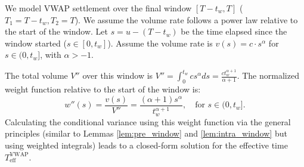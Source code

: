 \documentclass[11pt]{article}
\theoremstyle{plain}
\begin{document}
We model VWAP settlement over the final window $[T-t_w, T]$ ($T_1=T-t_w, T_2=T$). We assume the volume rate follows a power law relative to the start of the window. Let $s = u - (T-t_w)$ be the time elapsed since the window started ($s \in [0, t_w]$). Assume the volume rate is $v(s) = c \cdot s^\alpha$ for $s \in (0, t_w]$, with $\alpha > -1$.

The total volume $V''$ over this window is $V'' = \int_{0}^{t_w} c s^\alpha ds = \frac{c t_w^{\alpha+1}}{\alpha+1}$. The normalized weight function relative to the start of the window is:
\begin{equation} \label{eq:powerlaw_window_weight_relative_final}
  w''(s) = \frac{v(s)}{V''} = \frac{(\alpha+1) s^\alpha}{t_w^{\alpha+1}}, \quad \text{for } s \in (0, t_w].
\end{equation}
Calculating the conditional variance using this weight function via the general principles (similar to Lemmas \ref{lem:pre_window} and \ref{lem:intra_window} but using weighted integrals) leads to a closed-form solution for the effective time $T_{\mathrm{eff}}^{\mathrm{VWAP}}$.
\end{document}
